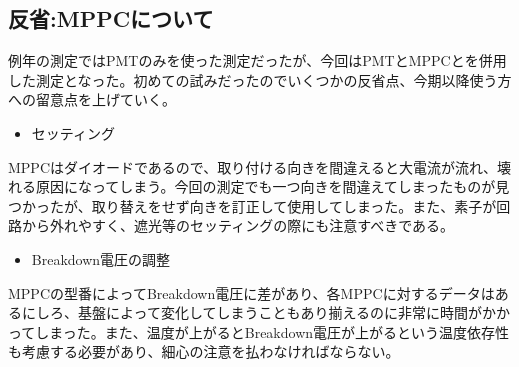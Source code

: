 \subsection{反省:MPPCについて}
例年の測定ではPMTのみを使った測定だったが、今回はPMTとMPPCとを併用した測定となった。初めての試みだったのでいくつかの反省点、今期以降使う方への留意点を上げていく。
\begin{itemize}
\item セッティング
\end{itemize}
MPPCはダイオードであるので、取り付ける向きを間違えると大電流が流れ、壊れる原因になってしまう。今回の測定でも一つ向きを間違えてしまったものが見つかったが、取り替えをせず向きを訂正して使用してしまった。また、素子が回路から外れやすく、遮光等のセッティングの際にも注意すべきである。
\begin{itemize}
\item Breakdown電圧の調整
\end{itemize}
MPPCの型番によってBreakdown電圧に差があり、各MPPCに対するデータはあるにしろ、基盤によって変化してしまうこともあり‎揃えるのに非常に時間がかかってしまった。また、温度が上がるとBreakdown電圧が上がるという温度依存性も考慮する必要があり、細心の注意を払わなければならない。
